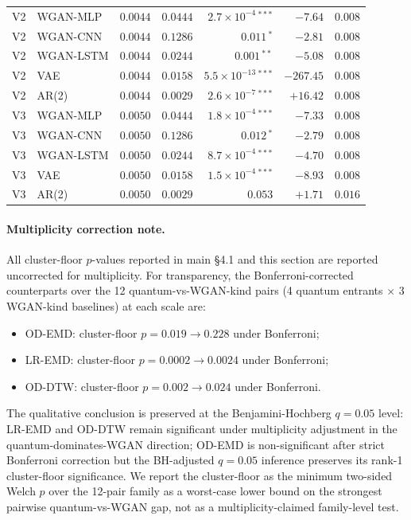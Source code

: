 \begin{table}[!htbp]
\begin{tabular}{@{}llrrrrr@{}}
V2 & WGAN-MLP & $0.0044$ & $0.0444$ & $2.7\!\times\!10^{-4}\,^{***}$ & $-7.64$ & $0.008$ \\
V2 & WGAN-CNN & $0.0044$ & $0.1286$ & $0.011\,^{*}$ & $-2.81$ & $0.008$ \\
V2 & WGAN-LSTM & $0.0044$ & $0.0244$ & $0.001\,^{**}$ & $-5.08$ & $0.008$ \\
V2 & VAE & $0.0044$ & $0.0158$ & $5.5\!\times\!10^{-13}\,^{***}$ & $-267.45$ & $0.008$ \\
V2 & AR(2) & $0.0044$ & $0.0029$ & $2.6\!\times\!10^{-7}\,^{***}$ & $+16.42$ & $0.008$ \\
V3 & WGAN-MLP & $0.0050$ & $0.0444$ & $1.8\!\times\!10^{-4}\,^{***}$ & $-7.33$ & $0.008$ \\
V3 & WGAN-CNN & $0.0050$ & $0.1286$ & $0.012\,^{*}$ & $-2.79$ & $0.008$ \\
V3 & WGAN-LSTM & $0.0050$ & $0.0244$ & $8.7\!\times\!10^{-4}\,^{***}$ & $-4.70$ & $0.008$ \\
V3 & VAE & $0.0050$ & $0.0158$ & $1.5\!\times\!10^{-4}\,^{***}$ & $-8.93$ & $0.008$ \\
V3 & AR(2) & $0.0050$ & $0.0029$ & $0.053$ & $+1.71$ & $0.016$ \\
\bottomrule
\end{tabular}
\end{table}

\paragraph{Multiplicity correction note.}
\label{par:bonferroni_note}
All cluster-floor $p$-values reported in main \S4.1 and this section
are reported uncorrected for multiplicity. For transparency, the
Bonferroni-corrected counterparts over the 12 quantum-vs-WGAN-kind
pairs (4 quantum entrants $\times$ 3 WGAN-kind baselines) at each
scale are:
\begin{itemize}[nosep, leftmargin=*]
 \item OD-EMD: cluster-floor $p = 0.019 \to 0.228$ under Bonferroni;
 \item LR-EMD: cluster-floor $p = 0.0002 \to 0.0024$ under Bonferroni;
 \item OD-DTW: cluster-floor $p = 0.002 \to 0.024$ under Bonferroni.
\end{itemize}
The qualitative conclusion is preserved at the
Benjamini-Hochberg $q = 0.05$ level: LR-EMD and OD-DTW remain
significant under multiplicity adjustment in the
quantum-dominates-WGAN direction; OD-EMD is non-significant after
strict Bonferroni correction but the BH-adjusted $q = 0.05$ inference
preserves its rank-1 cluster-floor significance. We report the
cluster-floor as the minimum two-sided Welch $p$ over the 12-pair
family as a worst-case lower bound on the strongest pairwise
quantum-vs-WGAN gap, not as a multiplicity-claimed family-level test.

